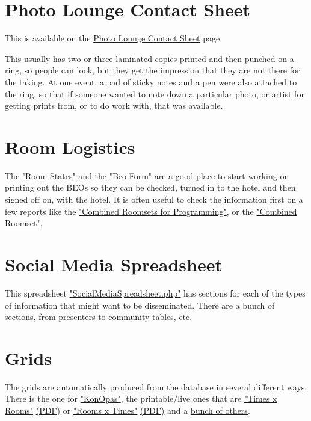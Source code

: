\documentclass[captions=tablesignature]{scrartcl}
\begin{document}
\section{Photo Lounge Contact Sheet}
\label{sec-5}

This is available on the \href{../webpages/PhotoLoungeContactSheet.php}{Photo Lounge Contact Sheet} page.

This usually has two or three laminated copies printed and then
punched on a ring, so people can look, but they get the impression
that they are not there for the taking.  At one event, a pad of
sticky notes and a pen were also attached to the ring, so that if
someone wanted to note down a particular photo, or artist for
getting prints from, or to do work with, that was available.

\section{Room Logistics}
\label{sec-6}

The \href{../webpages/LogisticsPrint.php}{"Room States"} and the \href{../webpages/genreport.php?reportid=188}{"Beo Form"} are a good place to start
working on printing out the BEOs so they can be checked, turned in
to the hotel and then signed off on, with the hotel.  It is often
useful to check the information first on a few reports like the
\href{../webpages/genreport.php?reportid=137}{"Combined Roomsets for Programming"}, or the \href{../webpages/genreport.php?reportid=100}{"Combined Roomset"}.

\section{Social Media Spreadsheet}
\label{sec-7}

This spreadsheet \href{../webpages/SocialMediaSpreadsheet.php}{"SocialMediaSpreadsheet.php"} has sections for each
of the types of information that might want to be disseminated.
There are a bunch of sections, from presenters to community tables,
etc.

\section{Grids}
\label{sec-8}

The grids are automatically produced from the database in several
different ways.  There is the one for \href{../webpages/KonOpas.php#info}{"KonOpas"}, the printable/live
ones that are \href{../webpages/Postgrid-wide.php}{"Times x Rooms"} \href{../webpages/Postgrid-wide.php?print_p=y}{(PDF)} or \href{../webpages/Postgrid.php}{"Rooms x Times"} \href{../webpages/Postgrid.php?print_p=y}{(PDF)} and a
\href{../webpages/manualGRIDS.php}{bunch of others}.
\end{document}
